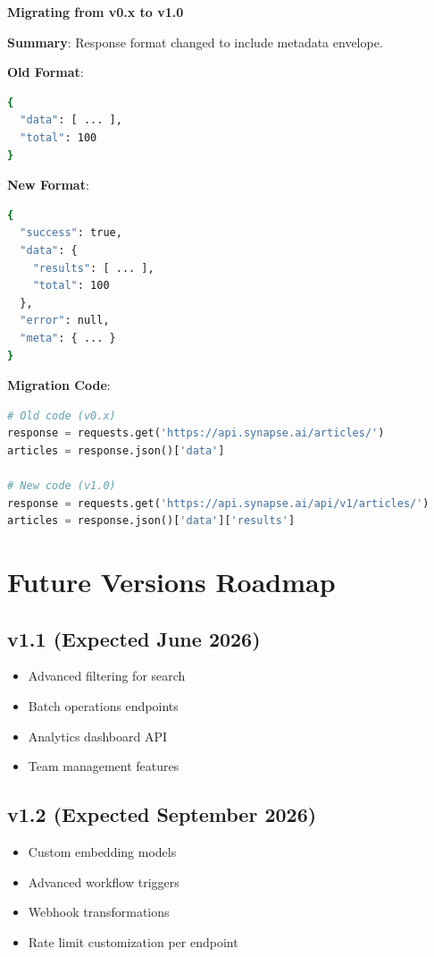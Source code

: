 \documentclass{report}
\begin{document}
\textbf{Migrating from v0.x to v1.0}

\textbf{Summary}: Response format changed to include metadata envelope.

\textbf{Old Format}:

\begin{lstlisting}[language=bash]
{
  "data": [ ... ],
  "total": 100
}
\end{lstlisting}

\textbf{New Format}:

\begin{lstlisting}[language=bash]
{
  "success": true,
  "data": {
    "results": [ ... ],
    "total": 100
  },
  "error": null,
  "meta": { ... }
}
\end{lstlisting}

\textbf{Migration Code}:

\begin{lstlisting}[language=Python]
# Old code (v0.x)
response = requests.get('https://api.synapse.ai/articles/')
articles = response.json()['data']

# New code (v1.0)
response = requests.get('https://api.synapse.ai/api/v1/articles/')
articles = response.json()['data']['results']
\end{lstlisting}

\section{Future Versions Roadmap}

\subsection{v1.1 (Expected June 2026)}

\begin{itemize}
    \item Advanced filtering for search
    \item Batch operations endpoints
    \item Analytics dashboard API
    \item Team management features
\end{itemize}

\subsection{v1.2 (Expected September 2026)}

\begin{itemize}
    \item Custom embedding models
    \item Advanced workflow triggers
    \item Webhook transformations
    \item Rate limit customization per endpoint
\end{itemize}
\end{document}
